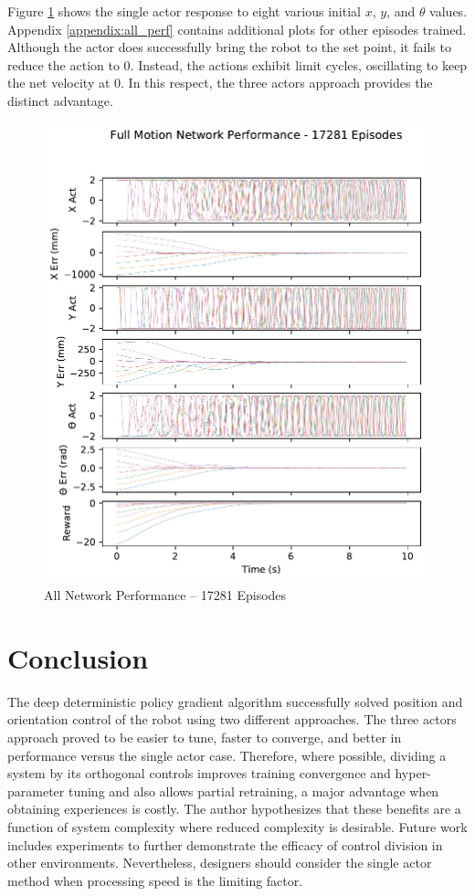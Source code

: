 Figure \ref{fig:all_perf} shows the single actor response to eight various initial $x$, $y$, and $\theta$ values. Appendix \ref{appendix:all_perf} contains additional plots for other episodes trained. Although the actor does successfully bring the robot to the set point, it fails to reduce the action to 0. Instead, the actions exhibit limit cycles, oscillating to keep the net velocity at 0. In this respect, the three actors approach provides the distinct advantage.
\begin{figure}[H]
	\centering
	\includegraphics[width=6in, keepaspectratio]{figures/train_figs/all_transitions/3_17281.pdf}
	\caption{All Network Performance -- 17281 Episodes}\label{fig:all_perf}
\end{figure}

\section{Conclusion}
The deep deterministic policy gradient algorithm successfully solved position and orientation control of the robot using two different approaches. The three actors approach proved to be easier to tune, faster to converge, and better in performance versus the single actor case. Therefore, where possible, dividing a system by its orthogonal controls improves training convergence and hyper-parameter tuning and also allows partial retraining, a major advantage when obtaining experiences is costly. The author hypothesizes that these benefits are a function of system complexity where reduced complexity is desirable.  Future work includes experiments to further demonstrate the efficacy of control division in other environments. Nevertheless, designers should consider the single actor method when processing speed is the limiting factor.

